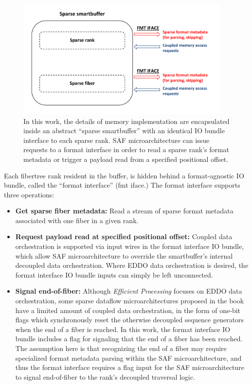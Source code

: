 \begin{figure}[ht]
    \centering
    \includegraphics[width=0.95\textwidth]{figures/sparse_sbuff_overview.pdf}
    \caption{In this work, the details of memory implementation are encapsulated inside an abstract ``sparse smartbuffer'' with an identical IO bundle interface to each sparse rank. SAF microarchitecture can issue requests to a format interface in order to read a sparse rank's format metadata or trigger a payload read from a specified positional offset.}
    \label{fig:sparse_sbuff_overview}
\end{figure}

Each fibertree rank resident in the buffer, is hidden behind a format-agnostic IO bundle, called the ``format interface'' (fmt iface.) The format interface supports three operations:

\begin{itemize}
    \item \textbf{Get sparse fiber metadata:} Read a stream of sparse format metadata associated with one fiber in a given rank.
    \item \textbf{Request payload read at specified positional offset:} Coupled data orchestration is supported via input wires in the format interface IO bundle, which allow SAF microarchitecture to override the smartbuffer's internal decoupled data orchestration. Where EDDO data orchestration is desired, the format interface IO bundle inputs can simply be left unconnected.
    \item \textbf{Signal end-of-fiber:} Although \textit{Efficient Processing}\cite{szebook} focuses on EDDO data orchestration, some sparse dataflow microarchitectures proposed in the book have a limited amount of coupled data orchestration, in the form of one-bit flags which synchronously reset the otherwise decoupled sequence generators when the end of a fiber is reached. In this work, the format interface IO bundle includes a flag for signaling that the end of a fiber has been reached. The assumption here is that recognizing the end of a fiber may require specialized format metadata parsing within the SAF microarchitecture, and thus the format interface requires a flag input for the SAF microarchitecture to signal end-of-fiber to the rank's decoupled traversal logic.
\end{itemize}

